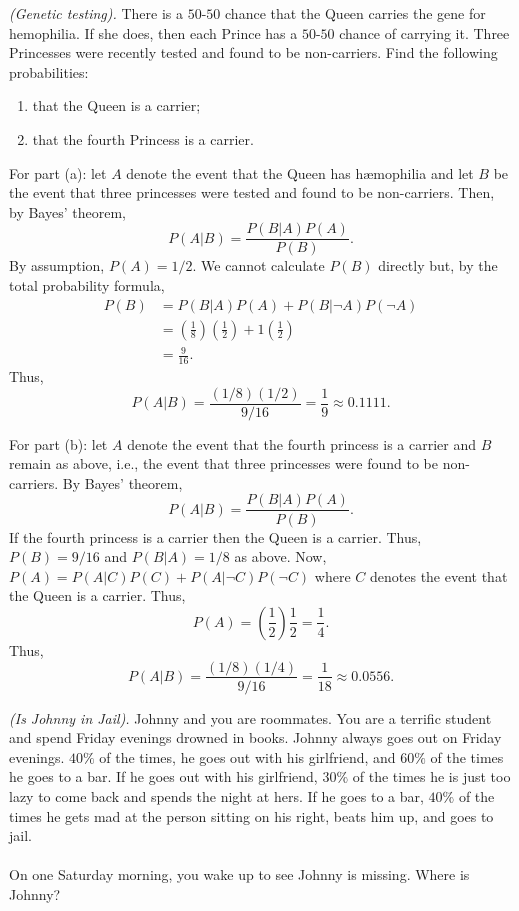 \begin{problem}[Handout 5, \# 2]
  \emph{(Genetic testing).} There is a \(50\)-\(50\) chance that the Queen
  carries the gene for hemophilia. If she does, then each Prince has a
  \(50\)-\(50\) chance of carrying it. Three Princesses were recently
  tested and found to be non-carriers. Find the following probabilities:
  \begin{enumerate}[label=(\alph*),noitemsep]
  \item that the Queen is a carrier;
  \item that the fourth Princess is a carrier.
  \end{enumerate}
\end{problem}
\begin{solution}
  For part (a): let \(A\) denote the event that the Queen has hæmophilia
  and let \(B\) be the event that three princesses were tested and found to
  be non-carriers. Then, by Bayes' theorem,
  \[
    P(A|B)=\frac{P(B|A)P(A)}{P(B)}.
  \]
  By assumption, \(P(A)=1/2\). We cannot calculate \(P(B)\) directly
  but, by the total probability formula,
  \begin{align*}
    P(B)&=P(B|A)P(A)+P(B|\lnot A)P(\lnot A)\\
        &=\left(\frac{1}{8}\right)\left(\frac{1}{2}\right)
          +1\left(\frac{1}{2}\right)\\
        &=\frac{9}{16}.
  \end{align*}
  Thus,
  \[
    P(A|B)=\frac{(1/8)(1/2)}{9/16}=\frac{1}{9}\approx\num{0.1111}.
  \]

  For part (b): let \(A\) denote the event that the fourth princess is a
  carrier and \(B\) remain as above, i.e., the event that three princesses
  were found to be non-carriers. By Bayes' theorem,
  \[
    P(A|B)=\frac{P(B|A)P(A)}{P(B)}.
  \]
  If the fourth princess is a carrier then the Queen is a carrier. Thus,
  \(P(B)=9/16\) and \(P(B|A)=1/8\) as above. Now,
  \(P(A)=P(A|C)P(C)+P(A|\lnot C)P(\lnot C)\) where \(C\) denotes the event
  that the Queen is a carrier. Thus,
  \[
    P(A)=\left(\frac{1}{2}\right)\frac{1}{2}=\frac{1}{4}.
  \]
  Thus,
  \[
    P(A|B)=\frac{(1/8)(1/4)}{9/16}=\frac{1}{18}\approx\num{0.0556}.
  \]
\end{solution}
\newpage

\begin{problem}[Handout 5, \# 4]
  \emph{(Is Johnny in Jail).} Johnny and you are roommates. You are a
  terrific student and spend Friday evenings drowned in books. Johnny
  always goes out on Friday evenings. \(40\%\) of the times, he goes out
  with his girlfriend, and \(60\%\) of the times he goes to a bar. If he
  goes out with his girlfriend, \(30\%\) of the times he is just too lazy
  to come back and spends the night at hers. If he goes to a bar, \(40\%\)
  of the times he gets mad at the person sitting on his right, beats him
  up, and goes to jail.
  \\\\
  On one Saturday morning, you wake up to see Johnny is missing. Where is
  Johnny?
\end{problem}
\begin{solution}

\end{solution}

